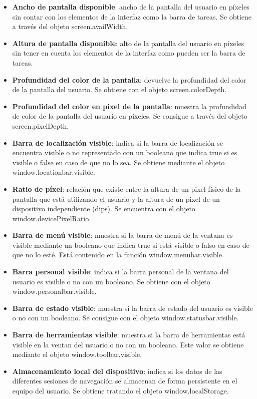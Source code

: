 \begin{itemize}
    \item \textbf{Ancho de pantalla disponible}: ancho de la pantalla del usuario en píxeles sin contar con los elementos de la interfaz como la barra de tareas. Se obtiene a través del objeto screen.availWidth.
    \item \textbf{Altura de pantalla disponible}: alto de la pantalla del usuario en píxeles sin tener en cuenta los elementos de la interfaz como pueden ser la barra de tareas.
    \item \textbf{Profundidad del color de la pantalla}: devuelve la profundidad del color de la pantalla del usuario. Se obtiene con el objeto screen.colorDepth.
    \item \textbf{Profundidad del color en pixel de la pantalla}: muestra la profundidad de color de la pantalla del usuario en píxeles. Se consigue a través del objeto screen.pixelDepth. 
    \item \textbf{Barra de localización visible}: indica si la barra de localización se encuentra visible o no representado con un booleano que indica true si es visible o false en caso de que no lo sea. Se obtiene mediante el objeto window.locationbar.visible.
    \item \textbf{Ratio de píxel}: relación que existe entre la altura de un pixel físico de la pantalla que está utilizando el usuario y la altura de un pixel de un dispositivo independiente (dips). Se encuentra con el objeto window.devicePixelRatio.
    \item \textbf{Barra de menú visible}: muestra si la barra de menú de la ventana es visible mediante un booleano que indica true si está visible o falso en caso de que no lo esté. Está contenido en la función window.menubar.visible.
    \item \textbf{Barra personal visible}: indica si la barra personal de la ventana del usuario es visible o no con un booleano. Se obtiene con el objeto window.personalbar.visible.
    \item \textbf{Barra de estado visible}: muestra si la barra de estado del usuario es visible o no con un booleano. Se consigue con el objeto window.statusbar.visible.
    \item \textbf{Barra de herramientas visible}: muestra si la barra de herramientas está visible en la ventan del usuario o no con un booleano. Este valor se obtiene mediante el objeto window.toolbar.visible.
    \item \textbf{Almacenamiento local del dispositivo}: indica si los datos de las diferentes sesiones de navegación se almacenan de forma persistente en el equipo del usuario. Se obtiene tratando el objeto window.localStorage.

\end{itemize}
